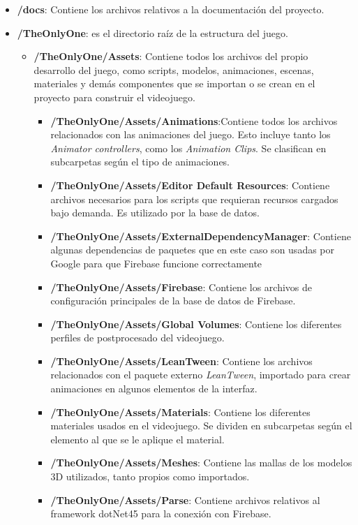 \begin{itemize}
    \item \textbf{/docs}: Contiene los archivos relativos a la documentación del proyecto.
    \item \textbf{/TheOnlyOne}: es el directorio raíz de la estructura del juego.
        \begin{itemize}
        \item \textbf{/TheOnlyOne/Assets}: Contiene todos los archivos del propio desarrollo del juego, como scripts, modelos, animaciones, escenas, materiales y demás componentes que se importan o se crean en el proyecto para construir el videojuego.
            \begin{itemize}
            \item \textbf{/TheOnlyOne/Assets/Animations}:Contiene todos los archivos relacionados con las animaciones del juego. Esto incluye tanto los \textit{Animator controllers}, como los  \textit{Animation Clips}. Se clasifican en subcarpetas según el tipo de animaciones.
            \item \textbf{/TheOnlyOne/Assets/Editor Default Resources}: Contiene archivos necesarios para los scripts que requieran recursos cargados bajo demanda. Es utilizado por la base de datos.
            \item \textbf{/TheOnlyOne/Assets/ExternalDependencyManager}: Contiene algunas dependencias de paquetes que en este caso son usadas por Google para que Firebase funcione correctamente
            \item \textbf{/TheOnlyOne/Assets/Firebase}: Contiene los archivos de configuración principales de la base de datos de Firebase.
            \item \textbf{/TheOnlyOne/Assets/Global Volumes}: Contiene los diferentes perfiles de postprocesado del videojuego.
            \item \textbf{/TheOnlyOne/Assets/LeanTween}: Contiene los archivos relacionados con el paquete externo \textit{LeanTween}, importado para crear animaciones en algunos elementos de la interfaz.
            \item \textbf{/TheOnlyOne/Assets/Materials}: Contiene los diferentes materiales usados en el videojuego. Se dividen en subcarpetas según el elemento al que se le aplique el material.
            \item \textbf{/TheOnlyOne/Assets/Meshes}: Contiene las mallas de los modelos 3D utilizados, tanto propios como importados.
            \item \textbf{/TheOnlyOne/Assets/Parse}: Contiene archivos relativos al framework dotNet45 para la conexión con Firebase.

\end{itemize}
\end{itemize}
\end{itemize}
